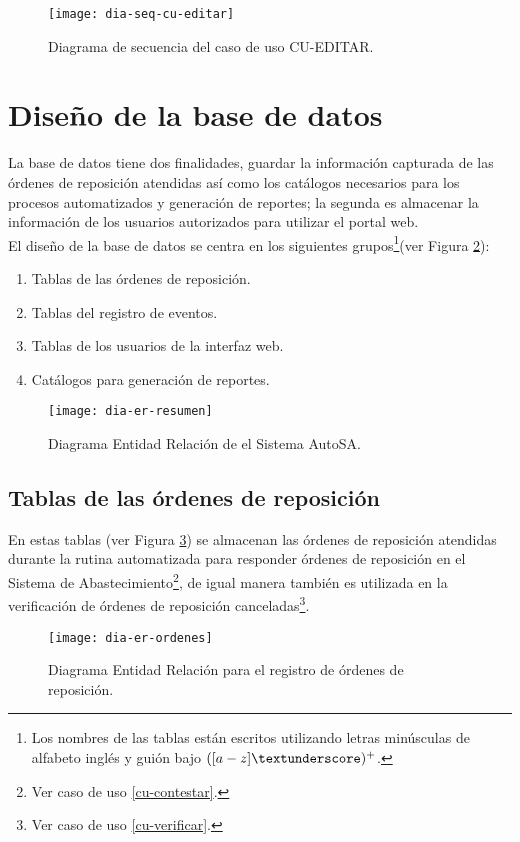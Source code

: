 \begin{figure}[h]
	\centering
	\texttt{[image: dia-seq-cu-editar]}
	\caption{Diagrama de secuencia del caso de uso CU-EDITAR.}
	\label{fig:dia-seq-cu-editar}
\end{figure}



\newpage
\section{Diseño de la base de datos}
La base de datos tiene dos finalidades, guardar la información capturada de las órdenes de reposición atendidas así como los catálogos necesarios para los procesos automatizados y generación de reportes; la segunda es almacenar la información de los usuarios autorizados para utilizar el portal web.\\
El diseño de la base de datos se centra en los siguientes grupos\footnote{Los nombres de las tablas están escritos utilizando letras minúsculas de alfabeto inglés y guión bajo $([a-z]{\textunderscore})^+$.}(ver Figura \ref{fig:dia-er-resumen}):
\begin{enumerate}
	\item Tablas de las órdenes de reposición.
	\item Tablas del registro de eventos.
	\item Tablas de los usuarios de la interfaz web.
	\item Catálogos para generación de reportes.
\end{enumerate}
\begin{figure}[h]
  \centering
  \texttt{[image: dia-er-resumen]}
  \caption{Diagrama Entidad Relación de el Sistema AutoSA.}
  \label{fig:dia-er-resumen}
\end{figure}


\subsection{Tablas de las órdenes de reposición}
En estas tablas (ver Figura \ref{fig:dia-er-ordenes}) se almacenan las órdenes de reposición atendidas durante la rutina automatizada para responder órdenes de reposición en el Sistema de Abastecimiento\footnote{Ver caso de uso \ref{cu-contestar}.}, de igual manera también es utilizada en la verificación de órdenes de reposición canceladas\footnote{Ver caso de uso \ref{cu-verificar}.}.
\begin{figure}[h]
  \centering
  \texttt{[image: dia-er-ordenes]} 
  \caption{Diagrama Entidad Relación para el registro de órdenes de reposición.}
  \label{fig:dia-er-ordenes}
\end{figure}
